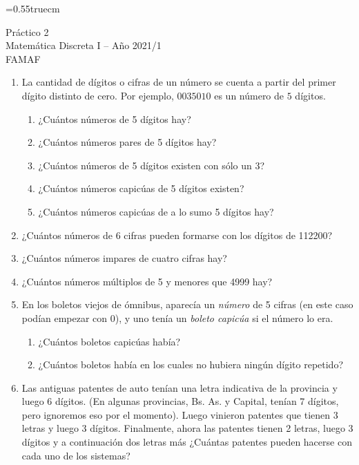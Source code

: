 \documentclass[a4paper,12pt,twoside,spanish,reqno]{amsbook}
\numberwithin{equation}{section}
\begin{document}
    \baselineskip=0.55truecm %
    


{\bf \begin{center} \large  Práctico 2 \\ Matemática Discreta I -- Año 2021/1 \\ FAMAF \end{center}}


\begin {enumerate}
\setlength\itemsep{1.1em}

\item La cantidad de dígitos o cifras de un número se cuenta a partir del primer dígito distinto de cero. Por ejemplo, $0035010$ es un número de $5$ dígitos.
\begin{enumerate}
\item ¿Cuántos números de 5 dígitos hay?
\item ¿Cuántos números pares de 5 dígitos  hay?
\item ¿Cuántos números de 5 dígitos existen con sólo un 3?
\item ¿Cuántos números capicúas de 5 dígitos existen?
\item ¿Cuántos números capicúas de a lo sumo 5 dígitos hay?
\end{enumerate}


\item ¿Cuántos números de 6 cifras pueden formarse con los dígitos de 112200?


\item ¿Cuántos números impares de cuatro cifras hay?


\item ¿Cuántos números múltiplos de  5 y menores que 4999 hay?


\item En los boletos viejos de ómnibus, aparecía un {\em número} de 5 cifras (en este caso podían empezar con 0), y uno tenía un {\it boleto capicúa} si el número lo era.
\begin{enumerate}
\item ¿Cuántos boletos capicúas había?
\item ¿Cuántos boletos había en los cuales no hubiera ningún dígito repetido?
\end{enumerate}


\item Las antiguas patentes de auto tenían una letra indicativa de la provincia y luego 6 dígitos. (En algunas provincias, Bs. As. y Capital, tenían 7 dígitos, pero ignoremos eso por el momento). Luego  vinieron patentes que tienen 3 letras y luego 3 dígitos. Finalmente, ahora las patentes tienen 2 letras, luego 3 dígitos y a continuación dos letras más ¿Cuántas patentes pueden hacerse con cada uno de los sistemas?



\end{enumerate}
\end{document}
